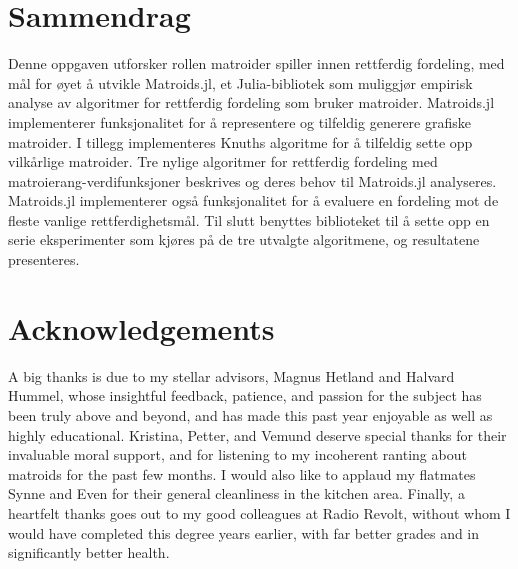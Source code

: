 \documentclass[b5paper]{report}
\begin{document}
\chapter*{Sammendrag}
\thispagestyle{empty}
Denne oppgaven utforsker rollen matroider spiller innen rettferdig fordeling, med mål for øyet å utvikle Matroids.jl, et Julia-bibliotek som muliggjør empirisk analyse av algoritmer for rettferdig fordeling som bruker matroider. Matroids.jl implementerer funksjonalitet for å representere og tilfeldig generere grafiske matroider. I tillegg implementeres Knuths algoritme for å tilfeldig sette opp vilkårlige matroider. Tre nylige algoritmer for rettferdig fordeling med matroierang-verdifunksjoner beskrives og deres behov til Matroids.jl analyseres. Matroids.jl implementerer også funksjonalitet for å evaluere en fordeling mot de fleste vanlige rettferdighetsmål. Til slutt benyttes biblioteket til å sette opp en serie eksperimenter som kjøres på de tre utvalgte algoritmene, og resultatene presenteres.



\chapter*{Acknowledgements}
\thispagestyle{empty}
A big thanks is due to my stellar advisors, Magnus Hetland and Halvard Hummel, whose insightful feedback, patience, and passion for the subject has been truly above and beyond, and has made this past year enjoyable as well as highly educational. Kristina, Petter, and Vemund deserve special thanks for their invaluable moral support, and for listening to my incoherent ranting about matroids for the past few months. I would also like to applaud my flatmates Synne and Even for their general cleanliness in the kitchen area. Finally, a heartfelt thanks goes out to my good colleagues at Radio Revolt, without whom I would have completed this degree years earlier, with far better grades and in significantly better health.


\tableofcontents









\printskelnotes{}
\printbibliography

\begin{appendices}
  
  
  
  
\end{appendices}
\end{document}
